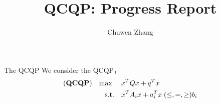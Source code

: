 \documentclass[aspectratio=1610, 10pt]{beamer}
\newcommand{\model}[1]{(\textbf{#1})}
\newcommand{\mx}{\mathbf{\max}\;}
\begin{document}
\title{QCQP: Progress Report}

\author{
  Chuwen Zhang
}


\maketitle
\begin{frame}{The QCQP}
  We consider the QCQP，
  \begin{equation}
    \label{eq:inhoqcqp}
    \begin{aligned}
      \model{QCQP} \quad \mx \quad & x^T Qx + q^T x                                        \\
      \textrm{s.t.} \quad          & x^T A_i x + a_i^T x \hspace{0.27em} (\le, =, \ge) b_i \\
    \end{aligned}
  \end{equation}
\end{frame}
\end{document}
